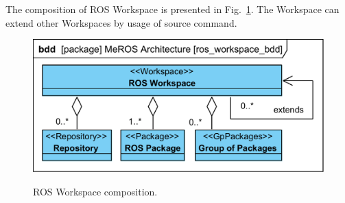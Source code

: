 \documentclass[11pt,oneside,a4paper]{report}
\begin{document}
The composition of ROS Workspace is presented in Fig.~\ref{fig:ros_workspace_bdd}. The Workspace can extend other Workspaces by usage of source command.

	\begin{figure}[H]
		\centering
		\begin{center}
			{\includegraphics[scale=1.0]{diagrams/ros_workspace_bdd.png}}
		\end{center}
		\caption{ROS Workspace composition.} 
		\label{fig:ros_workspace_bdd}
	\end{figure}

			
\AtNextBibliography{\small}
\printbibliography
	
\end{document}
